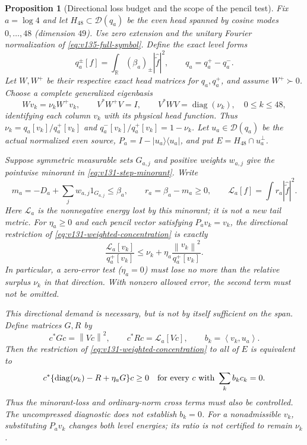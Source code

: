 \documentclass[11pt]{article}
\newtheorem{proposition}[theorem]{Proposition}
\theoremstyle{remark}
\newcommand{\norm}[1]{\left\lVert #1\right\rVert}
\newcommand{\ip}[2]{\left\langle #1,#2\right\rangle}
\begin{document}
\begin{proposition}[Directional loss budget and the scope of the pencil test]
\label{prop:v144-pencil-concentration}
Fix $a=\log4$ and let $H_{48}\subset\mathcal D(q_a)$ be the even
head spanned by cosine modes $0,\ldots,48$ (dimension $49$).
Use zero extension and the unitary Fourier normalization of
\eqref{eq:v135-full-symbol}. Define the exact level forms
\[
 q_a^\pm[f]=\int_{\mathbb R}(\beta_a)_\pm
                    |\widehat{\widetilde f}|^2,
 \qquad q_a=q_a^+-q_a^-.
\]
Let $W,W^+$ be their respective exact head matrices for $q_a,q_a^+$,
and assume $W^+\succ0$. Choose a complete generalized eigenbasis
\[
 Wv_k=\nu_k W^+v_k,\qquad
 V^*W^+V=I,\qquad V^*WV=\operatorname{diag}(\nu_k),
 \quad 0\le k\le48,
\]
identifying each column $v_k$ with its physical head function.
Thus $\nu_k=q_a[v_k]/q_a^+[v_k]$ and
$q_a^-[v_k]/q_a^+[v_k]=1-\nu_k$.
Let $u_a\in\mathcal D(q_a)$ be the actual normalized even source,
$P_a=I-|u_a\rangle\langle u_a|$, and put
$E=H_{48}\cap u_a^\perp$.

Suppose symmetric measurable sets $G_{a,j}$ and positive weights $w_{a,j}$
give the pointwise minorant in \eqref{eq:v131-step-minorant}. Write
\[
 m_a=-D_a+\sum_jw_{a,j}1_{G_{a,j}}\le\beta_a,\qquad
 r_a=\beta_a-m_a\ge0,\qquad
 \mathcal L_a[f]=\int r_a|\widehat{\widetilde f}|^2.
\]
Here $\mathcal L_a$ is the nonnegative energy lost by this minorant;
it is not a new tail metric. For $\eta_a\ge0$ and each pencil
vector satisfying $P_av_k=v_k$, the directional restriction of
\eqref{eq:v131-weighted-concentration} is exactly
\begin{equation}\label{eq:v144-direction-budget}
 \frac{\mathcal L_a[v_k]}{q_a^+[v_k]}
 \le\nu_k+\eta_a\frac{\norm{v_k}^2}{q_a^+[v_k]}.
\end{equation}
In particular, a zero-error test ($\eta_a=0$) must lose no more
than the relative surplus $\nu_k$ in that direction. With nonzero
allowed error, the second term must not be omitted.

This directional demand is necessary, but is not by itself sufficient
on the span. Define matrices $G,R$ by
\[
 c^*Gc=\norm{Vc}^2,\qquad c^*Rc=\mathcal L_a[Vc],
 \qquad b_k=\ip{v_k}{u_a}.
\]
Then the restriction of \eqref{eq:v131-weighted-concentration} to
\emph{all} of $E$ is equivalent to
\begin{equation}\label{eq:v144-pencil-matrix}
 c^*\{\operatorname{diag}(\nu_k)-R+\eta_a G\}c\ge0
 \quad\hbox{for every }c\hbox{ with }\sum_k b_kc_k=0.
\end{equation}
Thus the minorant-loss and ordinary-norm cross terms must also be
controlled. The uncompressed diagnostic does not establish $b_k=0$.
For a nonadmissible $v_k$, substituting $P_av_k$ changes both level
energies; its ratio is not certified to remain $\nu_k$.


\end{proposition}
\end{document}
